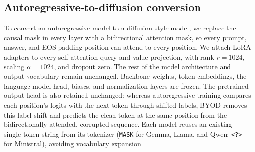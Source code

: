 \documentclass{article}
\begin{document}
\begin{table}[t]
\caption{Parent-model and adapter parameter counts, and measured time for 25,000 updates. Parent counts include shared embedding/output weights once; totals add the rank-1024 Q/V LoRA weights.}
\label{tab:models}
\centering
\small
{}
\end{table}

\subsection{Autoregressive-to-diffusion conversion}

To convert an autoregressive model to a diffusion-style model, we replace the causal mask in every layer with a bidirectional attention mask, so every prompt, answer, and EOS-padding position can attend to every position. We attach LoRA adapters to every self-attention query and value projection, with rank $r=1024$, scaling $\alpha=1024$, and dropout zero. The rest of the model architecture and output vocabulary remain unchanged. Backbone weights, token embeddings, the language-model head, biases, and normalization layers are frozen. The pretrained output head is also retained unchanged: whereas autoregressive training compares each position’s logits with the next token through shifted labels, BYOD removes this label shift and predicts the clean token at the same position from the bidirectionally attended, corrupted sequence. Each model reuses an existing single-token string from its tokenizer (\texttt{MASK} for Gemma, Llama, and Qwen; \texttt{<?>} for Ministral), avoiding vocabulary expansion.
\end{document}
